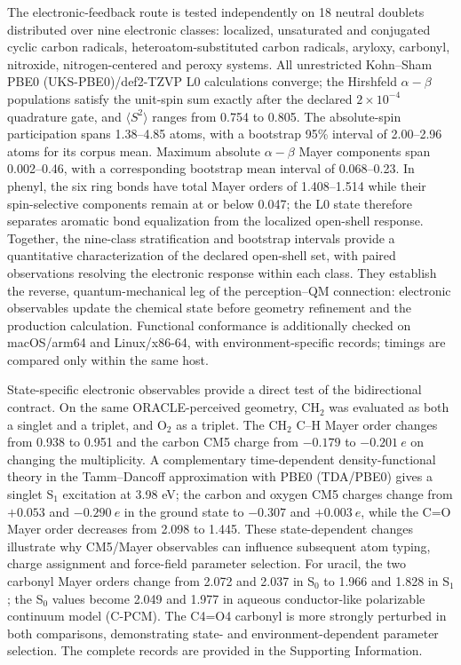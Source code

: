 \documentclass[journal=jctcce,manuscript=article]{achemso}
\begin{document}
The electronic-feedback route is tested independently on 18 neutral doublets
distributed over nine electronic classes: localized, unsaturated and
conjugated cyclic carbon radicals, heteroatom-substituted carbon radicals,
aryloxy, carbonyl, nitroxide, nitrogen-centered and peroxy
systems.  All unrestricted Kohn--Sham PBE0 (UKS-PBE0)/def2-TZVP L0 calculations converge; the Hirshfeld
$\alpha-\beta$ populations satisfy the unit-spin sum exactly after the
declared $2\times10^{-4}$ quadrature gate, and
$\langle S^2\rangle$ ranges from 0.754 to 0.805.  The absolute-spin
participation spans 1.38--4.85 atoms, with a bootstrap 95\% interval of
2.00--2.96 atoms for its corpus mean.  Maximum absolute
$\alpha-\beta$ Mayer components span 0.002--0.46, with a corresponding
bootstrap mean interval of 0.068--0.23.  In phenyl, the
six ring bonds have total Mayer orders of 1.408--1.514 while their
spin-selective components remain at or below 0.047; the L0 state therefore
separates aromatic bond equalization from the localized open-shell response.
Together, the nine-class stratification and bootstrap intervals provide a
quantitative characterization of the declared open-shell set, with paired
observations resolving the electronic response within each class.  They
establish the reverse, quantum-mechanical leg of the
perception--QM connection: electronic observables update the chemical state
before geometry refinement and the production calculation.
Functional conformance is additionally checked on macOS/arm64 and
Linux/x86-64, with environment-specific records; timings are compared only
within the same host.

State-specific electronic observables provide a direct test of the
bidirectional contract.  On the same ORACLE-perceived geometry, CH$_2$ was
evaluated as both a singlet and a triplet, and O$_2$ as a triplet.  The CH$_2$
C--H Mayer order changes from 0.938 to 0.951 and the carbon CM5 charge from
$-0.179$ to $-0.201~e$ on changing the multiplicity.  A complementary
time-dependent density-functional theory in the Tamm--Dancoff approximation with PBE0 (TDA/PBE0) gives a singlet S$_1$ excitation at
3.98 eV; the carbon and oxygen CM5 charges change from $+0.053$ and
$-0.290~e$ in the ground state to $-0.307$ and $+0.003~e$, while the C=O
Mayer order decreases from 2.098 to 1.445.  These state-dependent changes
illustrate why CM5/Mayer observables can influence subsequent atom typing,
charge assignment and force-field parameter selection.  For uracil, the two
carbonyl Mayer orders change from 2.072 and 2.037 in S$_0$ to 1.966 and 1.828
in S$_1$; the S$_0$ values become 2.049 and 1.977 in aqueous conductor-like
polarizable continuum model (C-PCM).  The
C4=O4 carbonyl is more strongly perturbed in both comparisons, demonstrating
state- and environment-dependent parameter selection.  The
complete records are provided in the Supporting Information.
\end{document}
